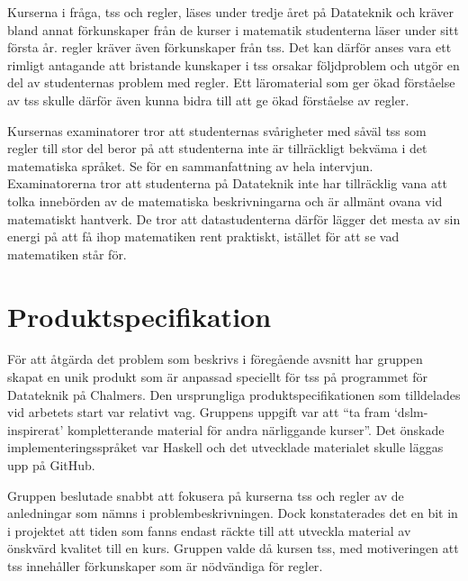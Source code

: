 \documentclass[12pt,a4paper,twoside,openright]{article}
\begin{document}
Kurserna i fråga, \gls{tss} och \gls{regler}, läses under tredje året
på Datateknik och kräver bland annat förkunskaper från de kurser i
matematik studenterna läser under sitt första år. \gls{regler} kräver
även förkunskaper från \gls{tss}. Det kan därför anses vara ett
rimligt antagande att bristande kunskaper i \gls{tss} orsakar
följdproblem och utgör en del av studenternas problem med
\gls{regler}. Ett läromaterial som ger ökad förståelse av \gls{tss}
skulle därför även kunna bidra till att ge ökad förståelse av \gls{regler}.

Kursernas examinatorer tror att studenternas svårigheter med
såväl \gls{tss} som \gls{regler}
till stor del beror på att studenterna inte är tillräckligt bekväma i
det matematiska språket. Se  för en
sammanfattning av hela intervjun. Examinatorerna tror att studenterna
på Datateknik inte har tillräcklig vana att tolka innebörden av de
matematiska beskrivningarna och är allmänt ovana vid matematiskt
hantverk. De tror att datastudenterna därför lägger det mesta av sin
energi på att få ihop matematiken rent praktiskt, istället för att se
vad matematiken står för.

\newpage

\section{Produktspecifikation}
För att åtgärda det problem som beskrivs i föregående avsnitt har
gruppen skapat en unik produkt som är anpassad speciellt för \gls{tss}
på programmet för Datateknik på Chalmers. Den ursprungliga
produktspecifikationen som tilldelades vid arbetets start var relativt
vag. Gruppens uppgift var att ``ta fram `\gls{dslm}-inspirerat'
kompletterande material för andra närliggande kurser''. Det önskade
implementerings\-språket var Haskell och det utvecklade materialet
skulle läggas upp på GitHub.

Gruppen beslutade snabbt att fokusera på kurserna \gls{tss} och
\gls{regler} av de anledningar som nämns i problembeskrivningen. Dock
konstaterades det en bit in i projektet att tiden som fanns endast
räckte till att utveckla material av önskvärd kvalitet till en
kurs. Gruppen valde då kursen \gls{tss}, med motiveringen att
\gls{tss} innehåller förkunskaper som är nödvändiga för \gls{regler}.
\end{document}
